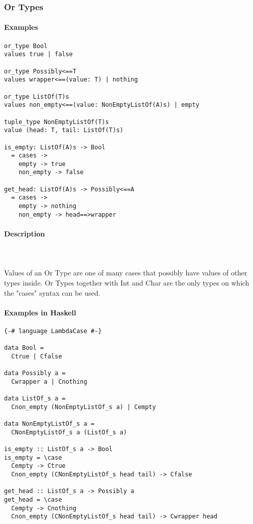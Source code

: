 \documentclass{article}
\def\H{Haskell}
\begin{document}
\subsubsection{Or Types}

\paragraph{Examples}

\begin{verbatim}
or_type Bool
values true | false

or_type Possibly<==T
values wrapper<==(value: T) | nothing

or_type ListOf(T)s
values non_empty<==(value: NonEmptyListOf(A)s) | empty

tuple_type NonEmptyListOf(T)s
value (head: T, tail: ListOf(T)s)

is_empty: ListOf(A)s -> Bool
  = cases -> 
    empty -> true
    non_empty -> false

get_head: ListOf(A)s -> Possibly<==A
  = cases -> 
    empty -> nothing
    non_empty -> head==>wrapper
\end{verbatim}

\paragraph{Description}\mbox{} \\\\
Values of an Or Type are one of many cases that possibly have values of other types
inside. Or Types together with Int and Char are the only types on which the "cases"
syntax can be used.

\paragraph{Examples in \H}

\begin{verbatim}
{-# language LambdaCase #-}

data Bool =
  Ctrue | Cfalse

data Possibly a =
  Cwrapper a | Cnothing

data ListOf_s a =
  Cnon_empty (NonEmptyListOf_s a) | Cempty

data NonEmptyListOf_s a =
  CNonEmptyListOf_s a (ListOf_s a)

is_empty :: ListOf_s a -> Bool
is_empty = \case
  Cempty -> Ctrue
  Cnon_empty (CNonEmptyListOf_s head tail) -> Cfalse

get_head :: ListOf_s a -> Possibly a
get_head = \case
  Cempty -> Cnothing
  Cnon_empty (CNonEmptyListOf_s head tail) -> Cwrapper head
\end{verbatim}
\end{document}
